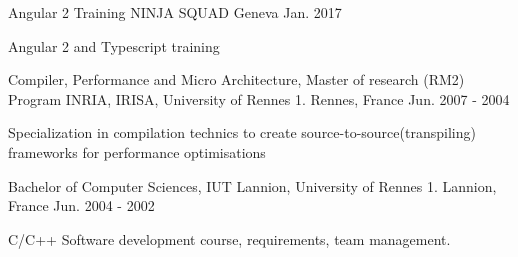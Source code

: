 

\begin{cventries}
\cventry
{Angular 2 Training} %
{NINJA SQUAD} %
{Geneva} %
{Jan. 2017} %
{
	\begin{cvitems} %
		\item {Angular 2 and Typescript training}
	\end{cvitems}
}
  \cventry
    {Compiler, Performance and Micro Architecture, Master of research (RM2) Program} %
    {INRIA, IRISA, University of Rennes 1. } %
    {Rennes, France} %
    {Jun. 2007 - 2004} %
    {
      \begin{cvitems} %
        \item {Specialization in compilation technics to create source-to-source(transpiling) frameworks for performance optimisations}
      \end{cvitems}
    }
\cventry
{Bachelor of Computer Sciences, } %
{IUT Lannion, University of Rennes 1. } %
{Lannion, France} %
{Jun. 2004 - 2002} %
{
	\begin{cvitems} %
			\item { C/C++ Software development course, requirements, team management. }
	\end{cvitems}
}

\end{cventries}
